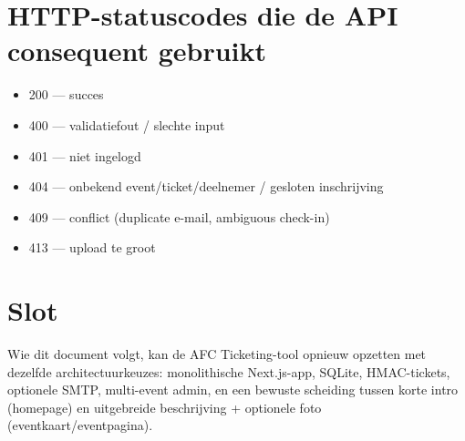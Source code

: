 \documentclass[11pt,a4paper]{report}
\begin{document}
\section{HTTP-statuscodes die de API consequent gebruikt}
\begin{itemize}[leftmargin=*]
  \item 200 --- succes
  \item 400 --- validatiefout / slechte input
  \item 401 --- niet ingelogd
  \item 404 --- onbekend event/ticket/deelnemer / gesloten inschrijving
  \item 409 --- conflict (duplicate e-mail, ambiguous check-in)
  \item 413 --- upload te groot
\end{itemize}

\section{Slot}
Wie dit document volgt, kan de AFC Ticketing-tool opnieuw opzetten met dezelfde
architectuurkeuzes: monolithische Next.js-app, SQLite, HMAC-tickets, optionele SMTP,
multi-event admin, en een bewuste scheiding tussen korte intro (homepage) en uitgebreide
beschrijving + optionele foto (eventkaart/eventpagina).
\end{document}
